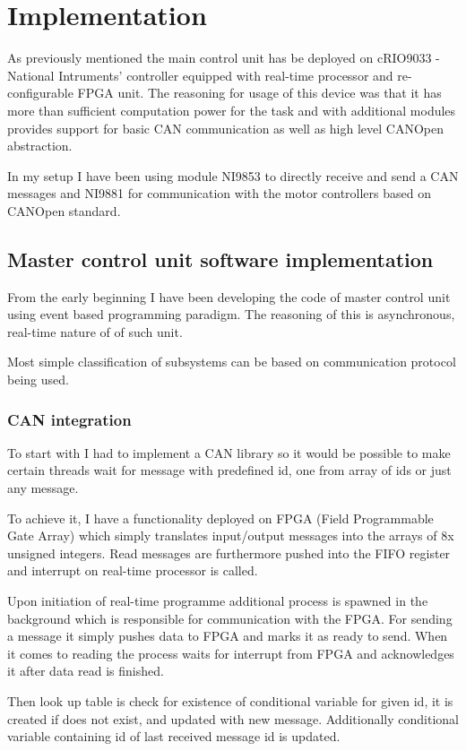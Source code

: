 \chapter{Implementation}
As previously mentioned the main control unit has be deployed on cRIO9033 - National Intruments' controller equipped with real-time processor and re-configurable FPGA unit. The reasoning for usage of this device was that it has more than sufficient computation power for the task and with additional modules provides support for basic CAN communication as well as high level CANOpen abstraction.


In my setup I have been using module NI9853 to directly receive and send a CAN messages and NI9881 for communication with the motor controllers based on CANOpen standard.

\section{Master control unit software implementation}
From the early beginning I have been developing the code of master control unit using event based programming paradigm. The reasoning of this is asynchronous, real-time nature of of such unit.

Most simple classification of subsystems can be based on communication protocol being used. 

\subsection{CAN integration}
To start with I had to implement a CAN library so it would be possible to make certain threads wait for message with predefined id, one from array of ids or just any message. 

To achieve it, I have a functionality deployed on FPGA (Field Programmable Gate Array) which simply translates input/output messages into the arrays of 8x unsigned integers. Read messages  are furthermore pushed into the FIFO register and interrupt on real-time processor is called.

Upon initiation of real-time programme additional process is spawned in the background which is responsible for communication with the FPGA. For sending a message it simply pushes data to FPGA and marks it as ready to send. When it comes to reading the process waits for interrupt from FPGA and acknowledges it after data read is finished. 

Then look up table is check for existence of conditional variable for given id, it is created if does not exist, and updated with new message. Additionally conditional variable containing id of last received message id is updated.

